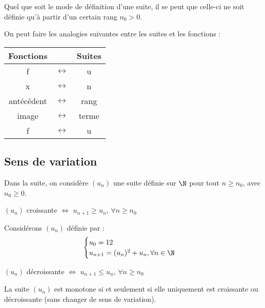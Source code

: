 \documentclass[11pt]{article}
\begin{document}
\begin{remarque}
Quel que soit le mode de définition
d'une suite, il se peut que celle-ci
ne soit définie qu'à partir d'un
certain rang $n_0 > 0$.
\end{remarque}

\begin{remarque}
On peut faire les analogies suivantes
entre les suites et les fonctions :

\begin{center}
\begin{tabular}{|c|c|c|}
\hline
Fonctions&&Suites \\ \hline
f&$\leftrightarrow$&u \\ \hline
x&$\leftrightarrow$&n \\ \hline
antécédent&$\leftrightarrow$&rang \\ \hline
image&$\leftrightarrow$&terme \\ \hline
f&$\leftrightarrow$&u \\ \hline
\end{tabular}
\end{center}
\end{remarque}

\subsection{Sens de variation}

\begin{remarque}
Dans la suite, on considère $(u_n)$
une suite définie sur $\N$ pour tout
$n \ge n_0$, avec $n_0 \ge 0$.
\end{remarque}

\begin{definition}
$(u_n)$ croissante $\iff$ $u_{n+1}
\ge u_n$, $\forall n \ge n_0$
\end{definition}

\begin{exemple}
Considérons $(u_n)$ définie par :
\[ \begin{cases}
u_0 = 12 \\
u_{n+1} = (u_n)^2 + u_n, \forall n
\in \N
\end{cases} \]
\end{exemple}


\begin{definition}
$(u_n)$ décroissante $\iff$ $u_{n+1}
\le u_n$, $\forall n \ge n_0$
\end{definition}

\begin{definition}
La suite $(u_n)$ est monotone si et
seulement si elle uniquement est croissante ou décroissante (sans
changer de sens de variation).
\end{definition}
\end{document}
